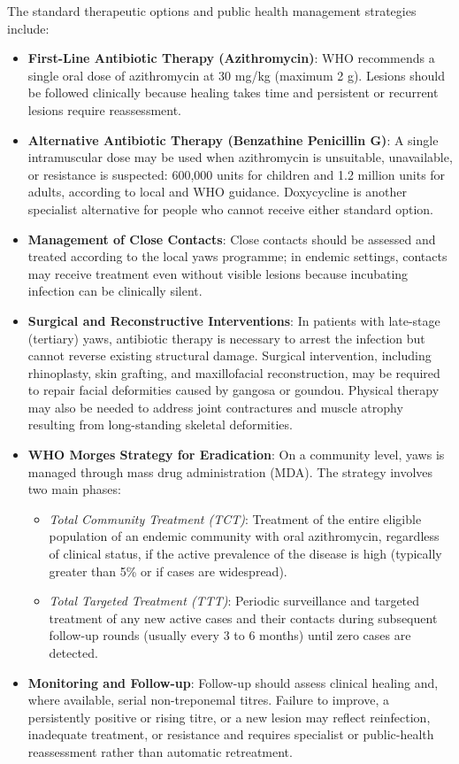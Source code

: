 The standard therapeutic options and public health management strategies include:
\begin{itemize}
    \item \textbf{First-Line Antibiotic Therapy (Azithromycin)}: WHO recommends a single oral dose of azithromycin at 30 mg/kg (maximum 2 g). Lesions should be followed clinically because healing takes time and persistent or recurrent lesions require reassessment.
    \item \textbf{Alternative Antibiotic Therapy (Benzathine Penicillin G)}: A single intramuscular dose may be used when azithromycin is unsuitable, unavailable, or resistance is suspected: 600,000 units for children and 1.2 million units for adults, according to local and WHO guidance. Doxycycline is another specialist alternative for people who cannot receive either standard option.
    \item \textbf{Management of Close Contacts}: Close contacts should be assessed and treated according to the local yaws programme; in endemic settings, contacts may receive treatment even without visible lesions because incubating infection can be clinically silent.
    \item \textbf{Surgical and Reconstructive Interventions}: In patients with late-stage (tertiary) yaws, antibiotic therapy is necessary to arrest the infection but cannot reverse existing structural damage. Surgical intervention, including rhinoplasty, skin grafting, and maxillofacial reconstruction, may be required to repair facial deformities caused by gangosa or goundou. Physical therapy may also be needed to address joint contractures and muscle atrophy resulting from long-standing skeletal deformities.
    \item \textbf{WHO Morges Strategy for Eradication}: On a community level, yaws is managed through mass drug administration (MDA). The strategy involves two main phases:
    \begin{itemize}
        \item \textit{Total Community Treatment (TCT)}: Treatment of the entire eligible population of an endemic community with oral azithromycin, regardless of clinical status, if the active prevalence of the disease is high (typically greater than 5\% or if cases are widespread).
        \item \textit{Total Targeted Treatment (TTT)}: Periodic surveillance and targeted treatment of any new active cases and their contacts during subsequent follow-up rounds (usually every 3 to 6 months) until zero cases are detected.
    \end{itemize}
    \item \textbf{Monitoring and Follow-up}: Follow-up should assess clinical healing and, where available, serial non-treponemal titres. Failure to improve, a persistently positive or rising titre, or a new lesion may reflect reinfection, inadequate treatment, or resistance and requires specialist or public-health reassessment rather than automatic retreatment.
\end{itemize}

